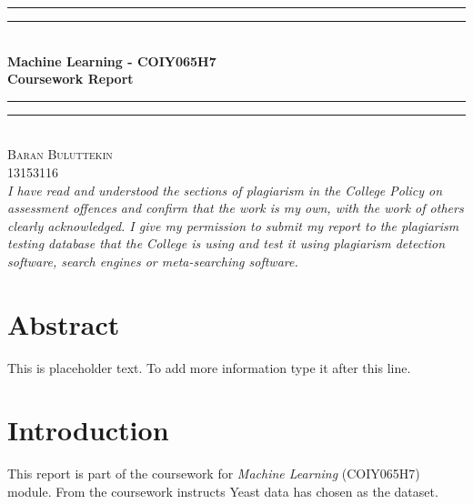 \documentclass[12pt]{article}
\begin{document}
\begin{titlepage}
    \begin{center}
        \vspace*{.06\textheight}{\scshape\LARGE Birkbeck, University of London\par}\vspace{1.5cm} %
        \rule[0.5ex]{\linewidth}{2pt}\vspace*{-\baselineskip}\vspace*{3.2pt}
        \rule[0.5ex]{\linewidth}{1pt}\\[\baselineskip]
        \huge{\bfseries Machine Learning - COIY065H7\\Coursework Report}\\[4mm]
        \rule[0.5ex]{\linewidth}{1pt}\vspace*{-\baselineskip}\vspace{3.2pt}
        \rule[0.5ex]{\linewidth}{2pt}\\
        [2.5cm]
    
        \textsc{\Large Baran Buluttekin\\13153116}\\
        [1.5cm]
        \large \textit{ I have read and understood the sections of plagiarism in the College Policy on assessment offences and confirm that the work is my own, with the work of others clearly acknowledged. I give my permission to submit my report to the plagiarism testing database that the College is using and test it using plagiarism detection software, search engines or meta-searching software.}


    \end{center}
    \cleardoublepage
\end{titlepage}   


\section*{Abstract}
This is placeholder text. To add more information type it after this line.\\
\cleardoublepage


\tableofcontents
\thispagestyle{empty}
\cleardoublepage

\setcounter{page}{1}



\section{Introduction} \label{sec:introduction}
This report is part of the coursework for \textit{Machine Learning} (COIY065H7) module. From the coursework instructs Yeast data \cite{data} has chosen as the dataset.
\end{document}
